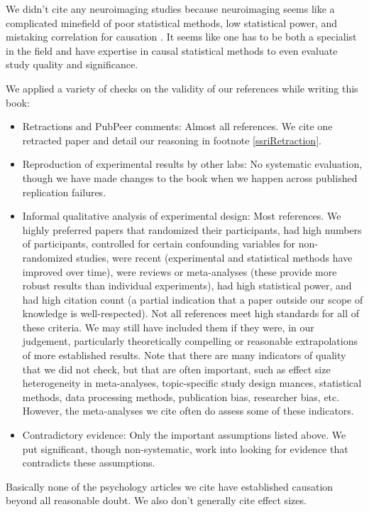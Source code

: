 \documentclass[12pt,letterpaper]{book}
\begin{document}
We didn't cite any neuroimaging studies because neuroimaging seems like a complicated minefield of poor statistical methods, low statistical power, and mistaking correlation for causation \cite{hoelNeuroscience}. It seems like one has to be both a specialist in the field and have expertise in causal statistical methods to even evaluate study quality and significance.

We applied a variety of checks on the validity of our references while writing this book:
\begin{itemize}
    \item Retractions and PubPeer comments: Almost all references. We cite one retracted paper and detail our reasoning in footnote \ref{ssriRetraction}.
    \item Reproduction of experimental results by other labs: No systematic evaluation, though we have made changes to the book when we happen across published replication failures.
    \item Informal qualitative analysis of experimental design: Most references. We highly preferred papers that randomized their participants, had high numbers of participants, controlled for certain confounding variables for non-randomized studies, were recent (experimental and statistical methods have improved over time), were reviews or meta-analyses (these provide more robust results than individual experiments), had high statistical power, and had high citation count (a partial indication that a paper outside our scope of knowledge is well-respected). Not all references meet high standards for all of these criteria. We may still have included them if they were, in our judgement, particularly theoretically compelling or reasonable extrapolations of more established results. Note that there are many indicators of quality that we did not check, but that are often important, such as effect size heterogeneity in meta-analyses, topic-specific study design nuances, statistical methods, data processing methods, publication bias, researcher bias, etc. However, the meta-analyses we cite often do assess some of these indicators.
    \item Contradictory evidence: Only the important assumptions listed above. We put significant, though non-systematic, work into looking for evidence that contradicts these assumptions.
\end{itemize}
Basically none of the psychology articles we cite have established causation beyond all reasonable doubt. We also don't generally cite effect sizes.
\end{document}
